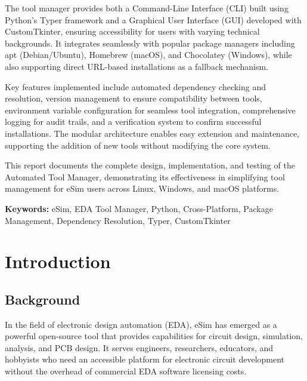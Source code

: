 \documentclass[12pt,a4paper]{report}
\begin{document}
The tool manager provides both a Command-Line Interface (CLI) built using Python's Typer framework and a Graphical User Interface (GUI) developed with CustomTkinter, ensuring accessibility for users with varying technical backgrounds. It integrates seamlessly with popular package managers including apt (Debian/Ubuntu), Homebrew (macOS), and Chocolatey (Windows), while also supporting direct URL-based installations as a fallback mechanism.

Key features implemented include automated dependency checking and resolution, version management to ensure compatibility between tools, environment variable configuration for seamless tool integration, comprehensive logging for audit trails, and a verification system to confirm successful installations. The modular architecture enables easy extension and maintenance, supporting the addition of new tools without modifying the core system.

This report documents the complete design, implementation, and testing of the Automated Tool Manager, demonstrating its effectiveness in simplifying tool management for eSim users across Linux, Windows, and macOS platforms.

\vskip 1cm
\textbf{Keywords:} eSim, EDA Tool Manager, Python, Cross-Platform, Package Management, Dependency Resolution, Typer, CustomTkinter

\tableofcontents
\newpage
\listoffigures
\newpage
\listoftables
\newpage

\setcounter{page}{1}

\chapter{Introduction}
\section{Background}
In the field of electronic design automation (EDA), eSim has emerged as a powerful open-source tool that provides capabilities for circuit design, simulation, analysis, and PCB design. It serves engineers, researchers, educators, and hobbyists who need an accessible platform for electronic circuit development without the overhead of commercial EDA software licensing costs.
\end{document}
